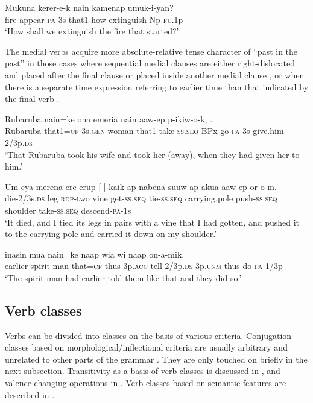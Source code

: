 \ea%
\label{ex:3:x1030}
\gll Mukuna kerer-e-k nain kamenap umuk-i-yan? \\
fire appear-\textsc{pa}-3s that1 how extinguish-Np-\textsc{fu}.1p\\
\glt`How shall we extinguish the fire that started?'
\z

The medial verbs acquire more absolute-relative tense character of ``past in the past'' \citep[65]{Comrie1985} in those cases where sequential medial clauses are either right-dislocated and placed after the final clause  or placed inside another medial clause , or when there is a separate time expression referring to earlier time than that indicated by the final verb . 

\ea%
\label{ex:3:x1031}
\gll Rubaruba nain=ke ona emeria nain aaw-ep p-ikiw-o-k, .\\
Rubaruba that1=\textsc{cf} 3s.\textsc{gen} woman that1 take-\textsc{ss}.\textsc{seq} BPx-go-\textsc{pa}-3s give.him-2/3p.\textsc{ds}\\
\glt`That Rubaruba took his wife and took her (away), when they had given her to him.'
\z

\ea%
\label{ex:3:x1032}
\gll Um-eya merena ere-erup [ ] kaik-ap nabena suuw-ap akua aaw-ep or-o-m.\\
die-2/3s.\textsc{ds} leg \textsc{rdp}-two vine get-\textsc{ss}.\textsc{seq} tie-\textsc{ss}.\textsc{seq} carrying.pole push-\textsc{ss}.\textsc{seq} shoulder take-\textsc{ss}.\textsc{seq} descend-\textsc{pa}-1s\\
\glt `It died, and I tied its legs in pairs with a vine that I had gotten, and pushed it to the carrying pole and carried it down on my shoulder.'
\z

\ea%
\label{ex:3:x1033}
\gll {} inasin mua nain=ke naap wia  wi naap on-a-mik.\\
earlier spirit man that=\textsc{cf} thus 3p.\textsc{acc} tell-2/3p.\textsc{ds} 3p.\textsc{unm} thus do-\textsc{pa}-1/3p\\
\glt `The spirit man had earlier told them like that and they did so.'
\z

\subsection{Verb classes} \label{sec:3:y:x}
{}
Verbs can be divided into classes on the basis of various criteria. Conjugation classes based on morphological/inflectional criteria are usually arbitrary and unrelated to other parts of the grammar \citep[191]{Anderson1985b}. They are only touched on briefly in the next subsection. Transitivity as a basis of verb classes is discussed in , and valence-changing operations in . Verb classes based on semantic features are described in .

